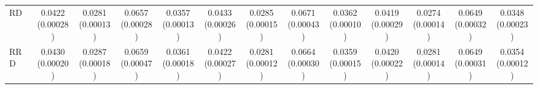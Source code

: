 \begin{table}[t]
\begin{tabular}{lcccccccccccc}
RD & \shortstack[c]{0.0422\\[-1pt]{\tiny(0.00028)}} & \shortstack[c]{0.0281\\[-1pt]{\tiny(0.00013)}} & \shortstack[c]{0.0657\\[-1pt]{\tiny(0.00028)}} & \shortstack[c]{0.0357\\[-1pt]{\tiny(0.00013)}} & \shortstack[c]{0.0433\\[-1pt]{\tiny(0.00026)}} & \shortstack[c]{0.0285\\[-1pt]{\tiny(0.00015)}} & \shortstack[c]{0.0671\\[-1pt]{\tiny(0.00043)}} & \shortstack[c]{0.0362\\[-1pt]{\tiny(0.00010)}} & \shortstack[c]{0.0419\\[-1pt]{\tiny(0.00029)}} & \shortstack[c]{0.0274\\[-1pt]{\tiny(0.00014)}} & \shortstack[c]{0.0649\\[-1pt]{\tiny(0.00032)}} & \shortstack[c]{0.0348\\[-1pt]{\tiny(0.00023)}} \\
RRD & \shortstack[c]{0.0430\\[-1pt]{\tiny(0.00020)}} & \shortstack[c]{0.0287\\[-1pt]{\tiny(0.00018)}} & \shortstack[c]{0.0659\\[-1pt]{\tiny(0.00047)}} & \shortstack[c]{0.0361\\[-1pt]{\tiny(0.00018)}} & \shortstack[c]{0.0422\\[-1pt]{\tiny(0.00027)}} & \shortstack[c]{0.0281\\[-1pt]{\tiny(0.00012)}} & \shortstack[c]{0.0664\\[-1pt]{\tiny(0.00030)}} & \shortstack[c]{0.0359\\[-1pt]{\tiny(0.00015)}} & \shortstack[c]{0.0420\\[-1pt]{\tiny(0.00022)}} & \shortstack[c]{0.0281\\[-1pt]{\tiny(0.00014)}} & \shortstack[c]{0.0649\\[-1pt]{\tiny(0.00031)}} & \shortstack[c]{0.0354\\[-1pt]{\tiny(0.00012)}} \\

\end{tabular}
\end{table}
